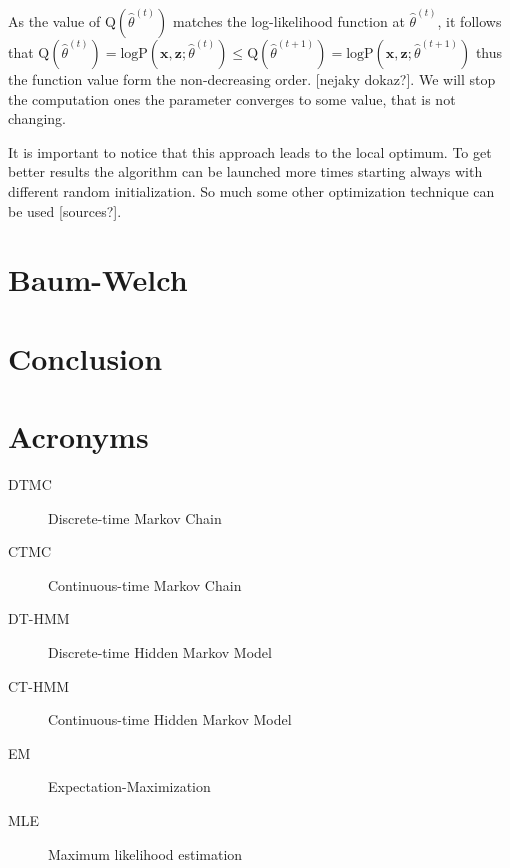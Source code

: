 \documentclass[thesis=M,english]{FITthesis}[2012/10/20]
\begin{document}
As the value of $\mathrm{Q}(\hat\theta^{(t)})$ matches the log-likelihood function at $\hat\theta^{(t)}$, it follows that $ \mathrm{Q}(\hat\theta^{(t)}) =  \mathrm{logP}(\mathbf{x},\mathbf{z};\hat \theta^{(t)}) \leq \mathrm{Q}(\hat\theta^{(t+1)}) =  \mathrm{logP}(\mathbf{x},\mathbf{z};\hat \theta^{(t+1)}) $ thus the function value form the non-decreasing order. [nejaky dokaz?]. We will stop the computation ones the parameter converges to some value, that is not changing.  

It is important to notice that this approach leads to the local optimum. To get better results the algorithm can be launched more times starting always with different random initialization. So much some other optimization technique can be used [sources?].    



    



\chapter{Baum-Welch}



\chapter{Conclusion}





\appendix

\chapter{Acronyms}
\begin{description}
	\item[DTMC] Discrete-time Markov Chain	
	\item[CTMC] Continuous-time Markov Chain
	\item[DT-HMM] Discrete-time Hidden Markov Model
	\item[CT-HMM] Continuous-time Hidden Markov Model
	\item[EM] Expectation-Maximization 
	\item[MLE] Maximum likelihood estimation
\end{description}
\end{document}
